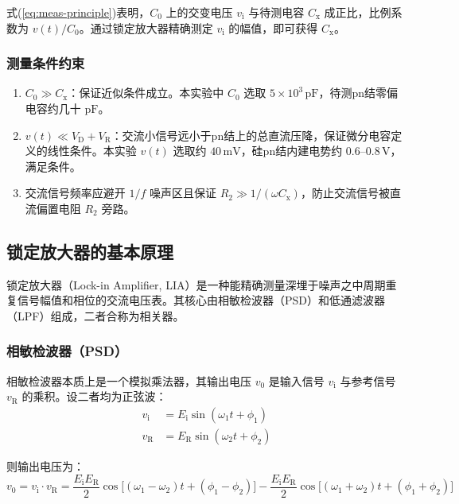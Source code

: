 式(\ref{eq:meas-principle})表明，$C_{0}$ 上的交变电压 $v_{\mathrm{i}}$ 与待测电容 $C_{\mathrm{x}}$ 成正比，比例系数为 $v(t)/C_{0}$。通过锁定放大器精确测定 $v_{\mathrm{i}}$ 的幅值，即可获得 $C_{\mathrm{x}}$。

\subsubsection{测量条件约束}

\begin{enumerate}
  \item $C_{0} \gg C_{\mathrm{x}}$：保证近似条件成立。本实验中 $C_{0}$ 选取 $5 \times 10^{3}\,\mathrm{pF}$，待测pn结零偏电容约几十 $\mathrm{pF}$。
  \item $v(t) \ll V_{\mathrm{D}} + V_{\mathrm{R}}$：交流小信号远小于pn结上的总直流压降，保证微分电容定义的线性条件。本实验 $v(t)$ 选取约 $40\,\mathrm{mV}$，硅pn结内建电势约 $0.6$--$0.8\,\mathrm{V}$，满足条件。
  \item 交流信号频率应避开 $1/f$ 噪声区且保证 $R_{2} \gg 1/(\omega C_{\mathrm{x}})$，防止交流信号被直流偏置电阻 $R_{2}$ 旁路。
\end{enumerate}


\subsection{锁定放大器的基本原理}

锁定放大器（Lock-in Amplifier, LIA）是一种能精确测量深埋于噪声之中周期重复信号幅值和相位的交流电压表。其核心由相敏检波器（PSD）和低通滤波器（LPF）组成，二者合称为相关器。

\subsubsection{相敏检波器（PSD）}

相敏检波器本质上是一个模拟乘法器，其输出电压 $v_{0}$ 是输入信号 $v_{\mathrm{i}}$ 与参考信号 $v_{\mathrm{R}}$ 的乘积。设二者均为正弦波：
\begin{align}
v_{\mathrm{i}} &= E_{\mathrm{i}}\sin(\omega_{1}t + \phi_{1}) \\
v_{\mathrm{R}} &= E_{\mathrm{R}}\sin(\omega_{2}t + \phi_{2})
\end{align}

则输出电压为：
\begin{equation}\label{eq:PSD-output}
v_{0} = v_{\mathrm{i}} \cdot v_{\mathrm{R}} = \frac{E_{\mathrm{i}}E_{\mathrm{R}}}{2}\cos\big[(\omega_{1}-\omega_{2})t + (\phi_{1}-\phi_{2})\big]
- \frac{E_{\mathrm{i}}E_{\mathrm{R}}}{2}\cos\big[(\omega_{1}+\omega_{2})t + (\phi_{1}+\phi_{2})\big]
\end{equation}

